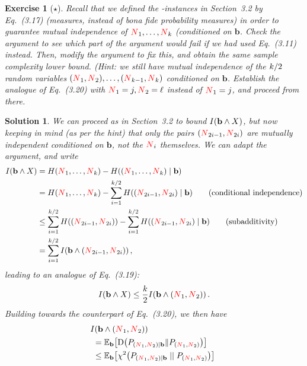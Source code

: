 \documentclass[biber,plain]{nowfnt} %
\newtheorem{question}{Exercise}[chapter]
\newtheorem{solution}{Solution}[chapter]
\newcommand{\occur}{\textcolor{red}{N}}
\newcommand{\occur}{N}
\begin{document}
\begin{question}[$\star$]\label{exo:paninski:mi:lb}
Recall that we defined the \no-instances in Section~3.2 by Eq.~(3.17) (measures, instead of \emph{bona fide} probability measures) in order to guarantee mutual independence of $\occur_1,\dots,\occur_\ab$ (conditioned on $\mathbf{b}$. Check the argument to see which part of the argument would fail if we had used Eq.~(3.11) instead. Then, modify the argument to fix this, and obtain the same sample complexity lower bound. \textit{(Hint: we still have mutual independence of the $k/2$ random variables $(\occur_1, \occur_2),\dots,(\occur_{\ab-1}, \occur_\ab)$ conditioned on $\mathbf{b}$. Establish the analogue of Eq.~(3.20) with $\occur_1=j,\occur_2=\ell$ instead of $\occur_1=j$, and proceed from there.}
\end{question}
\begin{solution}
We can proceed as in Section~3.2 to bound $\mutualinfo{\mathbf{b}}{X}$, but now keeping in mind (as per the hint) that only the pairs $(\occur_{2i-1}, \occur_{2i})$ are mutually independent conditioned on $\mathbf{b}$, not the $\occur_i$ themselves. We can adapt the argument, and write
\begin{align*}
\mutualinfo{\mathbf{b}}{X} 
&= \entropy{\occur_1,\dots,\occur_\ab} - \entropy{(\occur_1,\dots,\occur_\ab) \mid \mathbf{b}}  \\
&= \entropy{\occur_1,\dots,\occur_\ab} - \sum_{i=1}^{\ab/2} \entropy{(\occur_{2i-1}, \occur_{2i}) \mid \mathbf{b}}  \tag{conditional independence}\\
&\leq \sum_{i=1}^{\ab/2} \entropy{(\occur_{2i-1}, \occur_{2i})} - \sum_{i=1}^{\ab/2} \entropy{(\occur_{2i-1}, \occur_{2i}) \mid \mathbf{b}}  \tag{subadditivity}\\
&= \sum_{i=1}^{\ab/2}\mutualinfo{\mathbf{b}}{(\occur_{2i-1}, \occur_{2i})}\,,
\end{align*}
leading to an analogue of Eq.~(3.19):
\begin{equation}
	\mutualinfo{\mathbf{b}}{X} \leq \frac{\ab}{2} \mutualinfo{\mathbf{b}}{(\occur_{1}, \occur_{2})}\,.
\end{equation}
Building towards the counterpart of Eq.~(3.20), we then have
\begin{align*}
	&\!\!\mutualinfo{\mathbf{b}}{(\occur_{1}, \occur_{2})} \\
	&= \bE{\mathbf{b}}{\kldiv{P_{(\occur_1,\occur_2)\mid \mathbf{b}}}{P_{(\occur_1,\occur_2)}}} \notag\\
	&\leq \bE{\mathbf{b}}{\chisquare{P_{(\occur_1,\occur_2)\mid \mathbf{b}}}{P_{(\occur_1,\occur_2)}}} \notag\\

\end{align*}
\end{solution}
\end{document}
